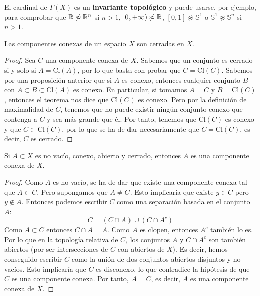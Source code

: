 \begin{observación}
    El cardinal de $\Gamma(X)$ es un \textbf{invariante topológico} y puede usarse, por ejemplo, para comprobar que $\mathbb{R} \not\approx \mathbb{R}^n$ si $n > 1$, $[0, +\infty) \not\approx \mathbb{R}$, $[0, 1] \not\approx \mathbb{S}^1$ o $\mathbb{S}^1 \not\approx \mathbb{S}^n$ si $n > 1$.
\end{observación}
\begin{proposición}
    Las componentes conexas de un espacio $X$ son cerradas en $X$.
\end{proposición}
\begin{proof}
    Sea $C$ una componente conexa de $X$. Sabemos que un conjunto es cerrado si y solo si $A = \mathrm{Cl}(A)$, por lo que basta con probar que $C = \mathrm{Cl}(C)$. Sabemos por una proposición anterior que si $A$ es conexo, entonces cualquier conjunto $B$ con $A \subset B \subset \mathrm{Cl}(A)$ es conexo.
    En particular, si tomamos $A = C$ y $B = \mathrm{Cl}(C)$, entonces el teorema nos dice que $\mathrm{Cl}(C)$ es conexo. Pero por la definición de maximalidad de $C$, tenemos que no puede existir ningún conjunto conexo que contenga a $C$ y sea más grande que él. Por tanto, tenemos que $\mathrm{Cl}(C)$ es conexo y que $C \subset \mathrm{Cl}(C)$, por lo que se ha de dar necesariamente que $C = \mathrm{Cl}(C)$, es decir, $C$ es cerrado.
\end{proof}
\begin{proposición}
    Si $A \subset X$ es no vacío, conexo, abierto y cerrado, entonces $A$ es una componente conexa de $X$.
\end{proposición}
\begin{proof}
    Como $A$ es no vacío, se ha de dar que existe una componente conexa tal que $A \subset C$. Pero supongamos que $A \neq C$. Esto implicaría que existe $y \in C$ pero $y \notin A$. Entonces podemos escribir $C$ como una separación basada en el conjunto $A$:
    $$C = (C \cap A) \cup (C \cap A^{c})$$
    Como $A \subset C$ entonces $C \cap A = A$. Como $A$ es clopen, entonces $A^c$ también lo es. Por lo que en la topología relativa de $C$, los conjuntos $A$ y $C \cap A^c$ son también abiertos (por ser intersecciones de $C$ con abiertos de $X$). Es decir, hemos conseguido escribir $C$ como la unión de dos conjuntos abiertos disjuntos y no vacíos. Esto implicaría que $C$ es disconexo, lo que contradice la hipótesis de que $C$ es una componente conexa. Por tanto, $A = C$, es decir, $A$ es una componente conexa de $X$.
\end{proof}
